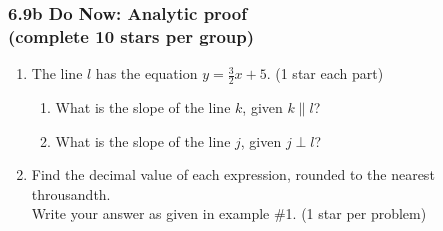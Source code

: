 \documentclass[12pt, twoside]{article}
\begin{document}
\subsubsection*{6.9b Do Now: Analytic proof\\[0.25cm]
(complete 10 stars per group)}
  \begin{enumerate}
    
  \item The line $l$ has the equation $y=\frac{3}{2}x+5$. \hfill (1 star each part)
    \begin{enumerate}
      \item What is the slope of the line $k$, given $k \parallel l$?
      \vspace{0.5cm}
      \item What is the slope of the line $j$, given $j \perp l$?
      \vspace{0.5cm}
    \end{enumerate}

  \item Find the decimal value of each expression, rounded to the nearest throusandth. \\[0.25cm]
  Write your answer as given in example \#1. \hfill (1 star per problem)
    \begin{enumerate}
    \end{enumerate}
    \vspace{1.5cm}


\end{enumerate}
\end{document}
